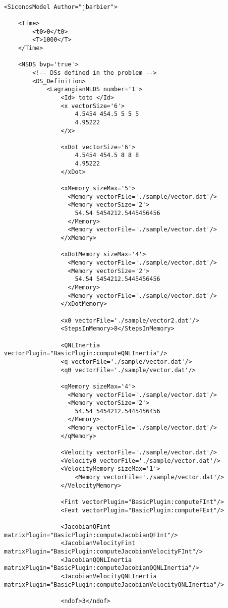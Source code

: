 \begin{verbatim}

<SiconosModel Author="jbarbier">

	<Time>
		<t0>0</t0>
		<T>1000</T>
	</Time>

	<NSDS bvp='true'>
		<!-- DSs defined in the problem -->
		<DS_Definition>
			<LagrangianNLDS number='1'>
				<Id> toto </Id>
				<x vectorSize='6'>
					4.5454 454.5 5 5 5
					4.95222
				</x>
				
				<xDot vectorSize='6'>
					4.5454 454.5 8 8 8
					4.95222
				</xDot>

				<xMemory sizeMax='5'>				
				  <Memory vectorFile='./sample/vector.dat'/>
				  <Memory vectorSize='2'>
				  	54.54 5454212.5445456456
				  </Memory>
				  <Memory vectorFile='./sample/vector.dat'/>				  				  
				</xMemory>
				  
				<xDotMemory sizeMax='4'>
				  <Memory vectorFile='./sample/vector.dat'/>
				  <Memory vectorSize='2'>
				  	54.54 5454212.5445456456
				  </Memory>
				  <Memory vectorFile='./sample/vector.dat'/>				  				  
				</xDotMemory>
				
				<x0 vectorFile='./sample/vector2.dat'/>
				<StepsInMemory>8</StepsInMemory>
				
				<QNLInertia vectorPlugin="BasicPlugin:computeQNLInertia"/>
				<q vectorFile='./sample/vector.dat'/>
				<q0 vectorFile='./sample/vector.dat'/>
			
				<qMemory sizeMax='4'>
				  <Memory vectorFile='./sample/vector.dat'/>
				  <Memory vectorSize='2'>
				  	54.54 5454212.5445456456
				  </Memory>
				  <Memory vectorFile='./sample/vector.dat'/>				  				  
				</qMemory>								
				
				<Velocity vectorFile='./sample/vector.dat'/>
				<Velocity0 vectorFile='./sample/vector.dat'/>
				<VelocityMemory sizeMax='1'>
					<Memory vectorFile='./sample/vector.dat'/>
				</VelocityMemory>

				<Fint vectorPlugin="BasicPlugin:computeFInt"/>
				<Fext vectorPlugin="BasicPlugin:computeFExt"/>

				<JacobianQFint matrixPlugin="BasicPlugin:computeJacobianQFInt"/>
				<JacobianVelocityFint matrixPlugin="BasicPlugin:computeJacobianVelocityFInt"/>
 				<JacobianQQNLInertia matrixPlugin="BasicPlugin:computeJacobianQQNLInertia"/>
 				<JacobianVelocityQNLInertia matrixPlugin="BasicPlugin:computeJacobianVelocityQNLInertia"/>					  

				<ndof>3</ndof>
			

\end{verbatim}
